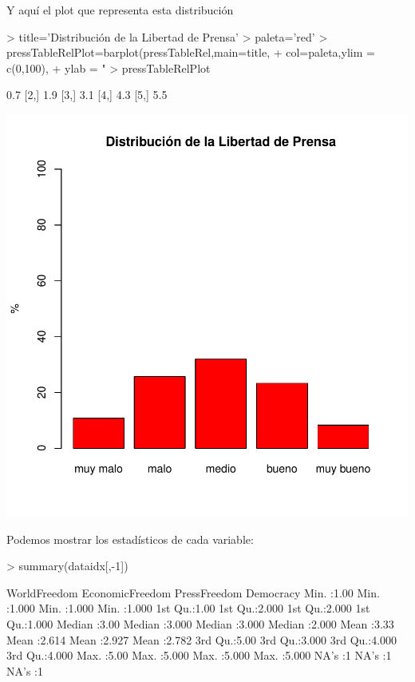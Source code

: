 \documentclass{article}
\begin{document}
Y aquí el plot que representa esta distribución
\begin{Schunk}
\begin{Sinput}
> title='Distribución de la Libertad de Prensa'
> paleta='red'
> pressTableRelPlot=barplot(pressTableRel,main=title,
+                           col=paleta,ylim = c(0,100),
+                           ylab = "%
> pressTableRelPlot
\end{Sinput}
\begin{Soutput}
     [,1]
[1,]  0.7
[2,]  1.9
[3,]  3.1
[4,]  4.3
[5,]  5.5
\end{Soutput}
\end{Schunk}
\includegraphics{version_0-pressTableRelPlot}


Podemos mostrar los estadísticos de cada variable:
\begin{Schunk}
\begin{Sinput}
> summary(dataidx[,-1])
\end{Sinput}
\begin{Soutput}
  WorldFreedom  EconomicFreedom  PressFreedom     Democracy    
 Min.   :1.00   Min.   :1.000   Min.   :1.000   Min.   :1.000  
 1st Qu.:1.00   1st Qu.:2.000   1st Qu.:2.000   1st Qu.:1.000  
 Median :3.00   Median :3.000   Median :3.000   Median :2.000  
 Mean   :3.33   Mean   :2.614   Mean   :2.927   Mean   :2.782  
 3rd Qu.:5.00   3rd Qu.:3.000   3rd Qu.:4.000   3rd Qu.:4.000  
 Max.   :5.00   Max.   :5.000   Max.   :5.000   Max.   :5.000  
 NA's   :1                      NA's   :1       NA's   :1      
\end{Soutput}
\end{Schunk}
\end{document}
